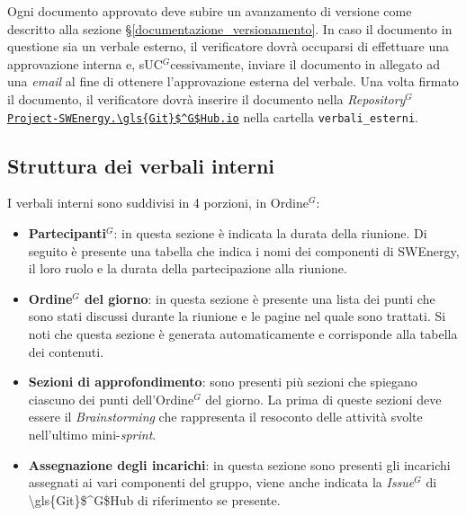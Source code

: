 Ogni documento approvato deve subire un avanzamento di versione come descritto
alla sezione \S\ref{documentazione_versionamento}.
\noindent
In caso il documento in questione sia un verbale esterno, il verificatore dovrà
occuparsi di effettuare una approvazione interna e, s\gls{UC}$^G$cessivamente, inviare il
documento in allegato ad una \textit{email} al fine di ottenere l'approvazione
esterna del verbale. Una volta firmato il documento, il verificatore dovrà
inserire il documento nella \textit{\gls{Repository}$^G$}
\href{https://\gls{\gls{Git}$^G$Hub}.com/Project-SWEnergy/Project-SWEnergy.\gls{\gls{Git}$^G$Hub}.io}{\texttt{Project-SWEnergy.\gls{\gls{Git}$^G$Hub}.io}}
nella cartella \texttt{verbali\_esterni}.


\subsection{Struttura dei verbali interni}

I verbali interni sono suddivisi in 4 porzioni, in \gls{Ordine}$^G$:
\begin{itemize}
	\item \textbf{\gls{Partecipanti}$^G$}: in questa sezione è indicata la durata della
	      riunione. Di seguito è presente una tabella che indica i nomi dei
	      componenti di SWEnergy, il loro ruolo e la durata della partecipazione
	      alla riunione.

	\item \textbf{\gls{Ordine}$^G$ del giorno}: in questa sezione è presente una lista
	      dei punti che sono stati discussi durante la riunione e le pagine nel
	      quale sono trattati. Si noti che questa sezione è generata
	      automaticamente e corrisponde alla tabella dei contenuti.

	\item \textbf{Sezioni di approfondimento}: sono presenti più sezioni che
	      spiegano ciascuno dei punti dell'\gls{Ordine}$^G$ del giorno. La prima di queste
	      sezioni deve essere il \textit{Brainstorming} che rappresenta il
	      resoconto delle attività svolte nell'ultimo mini-\textit{sprint}.

	\item \textbf{Assegnazione degli incarichi}: in questa sezione sono
	      presenti gli incarichi assegnati ai vari componenti del gruppo, viene
	      anche indicata la \textit{\gls{Issue}$^G$} di \gls{\gls{Git}$^G$Hub} di riferimento se presente.
\end{itemize}

